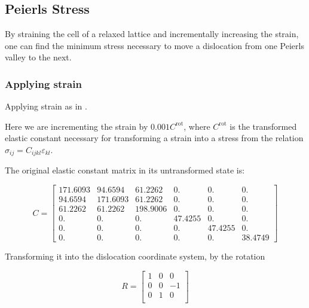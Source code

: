 \documentclass[11pt]{article}
\begin{document}
\subsection{Peierls Stress}
\label{sec:orgfddbd9f}

By straining the cell of a relaxed lattice and incrementally increasing the strain, one
can find the minimum stress necessary to move a dislocation from one
Peierls valley to the next. 

\subsubsection{Applying strain}
\label{sec:org933fb02}

Applying strain as in \cite{Chen2013}. 

Here we are incrementing the strain by \(0.001C^{\text{rot}}\), where \(C^{\text{rot}}\) is
the transformed elastic constant necessary for transforming a
strain into a stress from the relation \(\sigma_{ij} = C_{ijkl}\varepsilon_{kl}\).

The original elastic constant matrix in its untransformed state
is:

\begin{equation*}
 C =	
  \begin{bmatrix}
   171.6093 &  94.6594 &  61.2262 &   0.     &   0.      &  0.      \\
    94.6594 & 171.6093 &  61.2262 &   0.     &   0.      &  0.      \\
    61.2262 &  61.2262 & 198.9006 &   0.     &   0.      &  0.      \\
     0.     &   0.     &   0.     &  47.4255 &   0.      &  0.      \\
     0.     &   0.     &   0.     &   0.     &  47.4255  &  0.      \\
     0.     &   0.     &   0.     &   0.     &   0.      & 38.4749  
  \end{bmatrix}
\end{equation*}

Transforming it into the dislocation coordinate system, by the
rotation

\begin{equation*}
 R =	
  \begin{bmatrix}
    1 & 0 & 0 \\
    0 & 0 & -1 \\
    0 & 1 & 0 \\
  \end{bmatrix}
\end{equation*}
\end{document}
